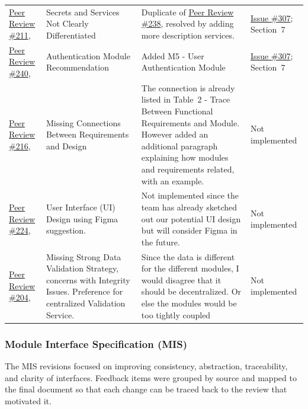 \documentclass{article}
\begin{document}
\begin{longtable}{p{} p{}
                  p{} p{}}
\href{https://github.com/thaafei/DomainX/issues/211}{Peer Review \#211},
&
Secrets and Services Not Clearly Differentiated
&
Duplicate of \href{https://github.com/thaafei/DomainX/issues/238}{Peer Review \#238}, resolved by adding more description services.
&
\href{https://github.com/thaafei/DomainX/issues/307}{Issue \#307}; Section~7
\\

\href{https://github.com/thaafei/DomainX/issues/240}{Peer Review \#240},
&
Authentication Module Recommendation
&
Added M5 - User Authentication Module
&
\href{https://github.com/thaafei/DomainX/issues/307}{Issue \#307}; Section~7
\\

\href{https://github.com/thaafei/DomainX/issues/216}{Peer Review \#216},
&
Missing Connections Between Requirements and Design
&
The connection is already listed in Table~2 - Trace Between Functional Requirements and Module. However added an additional paragraph explaining how modules and requirements related, with an example.
&
Not implemented
\\

\href{https://github.com/thaafei/DomainX/issues/224}{Peer Review \#224},
&
User Interface (UI) Design using Figma suggestion.
&
Not implemented since the team has already sketched out our potential UI design but will consider Figma in the future.
&
Not implemented
\\

\href{https://github.com/thaafei/DomainX/issues/204}{Peer Review \#204},
&
Missing Strong Data Validation Strategy, concerns with Integrity Issues. Preference for centralized Validation Service.
&
Since the data is different for the different modules, I would disagree that it should be decentralized. Or else the modules would be too tightly coupled
&
Not implemented
\\



\end{longtable}


\subsubsection{Module Interface Specification (MIS)}
\label{ssubsec:mis-trace}

The MIS revisions focused on improving consistency, abstraction,
traceability, and clarity of interfaces. Feedback items were grouped
by source and mapped to the final document so that each change can be
traced back to the review that motivated it.
\end{document}
